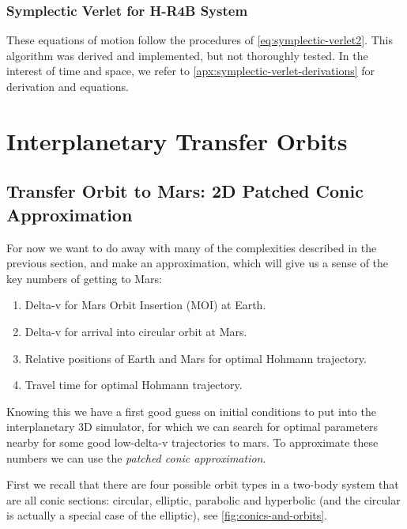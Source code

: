 \subsubsection{Symplectic Verlet for H-R4B System}

These equations of motion follow the procedures of \cref{eq:symplectic-verlet2}. This algorithm was derived and implemented, but not thoroughly tested. In the interest of time and space, we refer to \cref{apx:symplectic-verlet-derivations} for derivation and equations.

\section{Interplanetary Transfer Orbits}

\subsection{Transfer Orbit to Mars: 2D Patched Conic Approximation} \label{sec:2d-patched-conic}
For now we want to do away with many of the complexities described in the previous section, and make an approximation, which will give us a sense of the key numbers of getting to Mars:
\begin{enumerate}
	\item Delta-v for Mars Orbit Insertion (MOI) at Earth.
	\item Delta-v for arrival into circular orbit at Mars.
	\item Relative positions of Earth and Mars for optimal Hohmann trajectory.
	\item Travel time for optimal Hohmann trajectory.
\end{enumerate}

Knowing this we have a first good guess on initial conditions to put into the interplanetary 3D simulator, for which we can search for optimal parameters nearby for some good low-delta-v trajectories to mars. To approximate these numbers we can use the \emph{patched conic approximation}.

First we recall that there are four possible orbit types in a two-body system that are all conic sections: circular, elliptic, parabolic and hyperbolic (and the circular is actually a special case of the elliptic), see \cref{fig:conics-and-orbits}.

